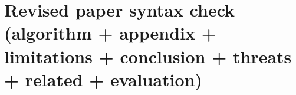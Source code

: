 \documentclass[11pt,a4paper]{article}
\begin{document}
\section*{Revised paper syntax check (algorithm + appendix + limitations + conclusion + threats + related + evaluation)}






\end{document}
